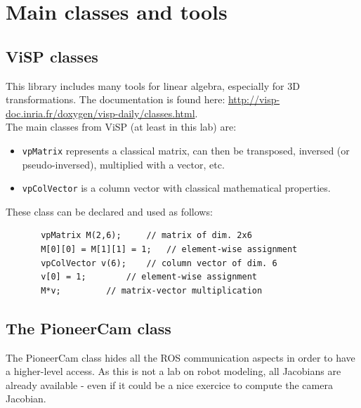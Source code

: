 \documentclass{ecnreport}
\begin{document}
\appendix

\section{Main classes and tools}\label{sec:classes}

\subsection{ViSP classes}

This library includes many tools for linear algebra, especially for 3D transformations. 
The documentation is found here: \url{http://visp-doc.inria.fr/doxygen/visp-daily/classes.html}.\\
The main classes from ViSP (at least in this lab) are:
\begin{itemize}
\item \texttt{vpMatrix} represents a classical matrix, can then be transposed, inversed (or pseudo-inversed), multiplied with a vector, etc.
\item \texttt{vpColVector} is a column vector with classical mathematical properties.
\end{itemize}
These class can be declared and used as follows:
\begin{center}\cppstyle
\begin{lstlisting}
       vpMatrix M(2,6); 	// matrix of dim. 2x6
       M[0][0] = M[1][1] = 1;	// element-wise assignment
       vpColVector v(6);	// column vector of dim. 6
       v[0] = 1;		// element-wise assignment
       M*v;			// matrix-vector multiplication
\end{lstlisting}
\end{center}

\subsection{The PioneerCam class}
\label{pioneer}
The PioneerCam class hides all the ROS communication aspects in order to have a higher-level access. As this is not a lab on robot modeling, all Jacobians are already 
available - even if it could be a nice exercice to compute the camera Jacobian. 
\end{document}
